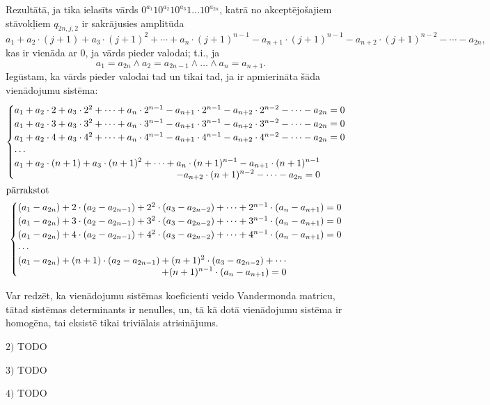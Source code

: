 \documentclass{ludis}
\begin{document}
\begin{pieradijums}
Rezultātā, ja tika ielasīts vārds $0^{a_1}10^{a_2}10^{a_3}1\ldots 10^{a_{2n}}$, katrā no akceptējošajiem stāvokļiem $q_{2n,j,2}$ ir sakrājusies amplitūda
\[
	a_1 + a_2 \cdot (j + 1) + a_3 \cdot (j + 1)^2 + \cdots + a_n \cdot (j + 1)^{n - 1} - a_{n+1} \cdot (j + 1)^{n - 1} - a_{n+2} \cdot (j + 1)^{n - 2} - \cdots - a_{2n},
\]
kas ir vienāda ar $0$, ja vārds pieder valodai; t.i., ja
\[
	a_1 = a_{2n} \wedge a_2 = a_{2n-1} \wedge \ldots \wedge a_n = a_{n+1}.
\]
Iegūstam, ka vārds pieder valodai tad un tikai tad, ja ir apmierināta šāda vienādojumu sistēma:
\begin{gather*}
\allowdisplaybreaks
	\begin{cases}
		a_1 + a_2 \cdot 2 + a_3 \cdot 2^2 + \cdots + a_n \cdot 2^{n - 1} - a_{n+1} \cdot 2^{n - 1} - a_{n+2} \cdot 2^{n - 2} - \cdots - a_{2n} = 0 \\
		a_1 + a_2 \cdot 3 + a_3 \cdot 3^2 + \cdots + a_n \cdot 3^{n - 1} - a_{n+1} \cdot 3^{n - 1} - a_{n+2} \cdot 3^{n - 2} - \cdots - a_{2n} = 0\\
		a_1 + a_2 \cdot 4 + a_3 \cdot 4^2 + \cdots + a_n \cdot 4^{n - 1} - a_{n+1} \cdot 4^{n - 1} - a_{n+2} \cdot 4^{n - 2} - \cdots - a_{2n} = 0\\
		\cdots \\
		\begin{split}
		a_1 + a_2 \cdot (n + 1) + a_3 \cdot (n + 1)^2 + \cdots + a_n \cdot (n + 1)^{n - 1} - a_{n+1} \cdot (n + 1)^{n - 1} \\
		\qquad- a_{n+2} \cdot (n + 1)^{n - 2} - \cdots - a_{2n} = 0\\
		\end{split}
	\end{cases}\\
\intertext{pārrakstot}
	\begin{cases}
		(a_1 - a_{2n}) + 2 \cdot (a_2 - a_{2n-1}) + 2^2 \cdot (a_3 - a_{2n-2}) + \cdots + 2^{n - 1} \cdot (a_n - a_{n+1}) = 0\\
		(a_1 - a_{2n}) + 3 \cdot (a_2 - a_{2n-1}) + 3^2 \cdot (a_3 - a_{2n-2}) + \cdots + 3^{n - 1} \cdot (a_n - a_{n+1}) = 0\\
		(a_1 - a_{2n}) + 4 \cdot (a_2 - a_{2n-1}) + 4^2 \cdot (a_3 - a_{2n-2}) + \cdots + 4^{n - 1} \cdot (a_n - a_{n+1}) = 0\\
		\cdots \\
		\begin{split}
		(a_1 - a_{2n}) + (n + 1) \cdot (a_2 - a_{2n-1}) + (n + 1)^2 \cdot (a_3 - a_{2n-2}) + \cdots \\
		\qquad+ (n + 1)^{n - 1} \cdot (a_n - a_{n+1}) = 0\\
		\end{split}	
	\end{cases}
\end{gather*}

Var redzēt, ka vienādojumu sistēmas koeficienti veido Vandermonda matricu, tātad sistēmas determinants ir nenulles, un, tā kā dotā vienādojumu sistēma ir homogēna, tai eksistē tikai triviālais atrisinājums.

$2)$ TODO

$3)$ TODO

$4)$ TODO
\end{pieradijums}
\end{document}
